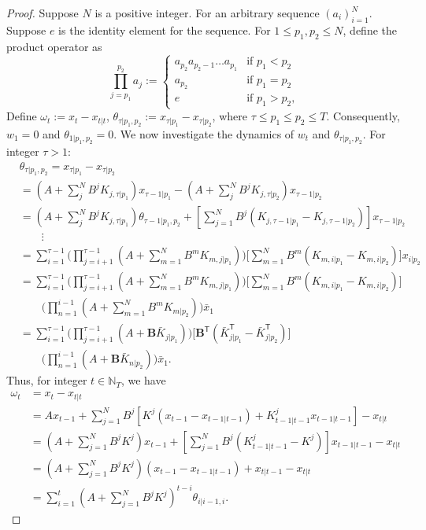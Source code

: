 \documentclass[letterpaper, 10 pt, conference]{ieeeconf}  %
\begin{document}
\begin{proof}
    Suppose $N$ is a positive integer. For an arbitrary sequence $(a_{i})_{i=1}^{N}$. Suppose $e$ is the identity element for the sequence. For $1\leq p_{1},p_{2}\leq N$, define the product operator as
\begin{equation*}
    \prod_{j=p_{1}}^{p_{2}} a_{j} := 
    \begin{cases}
        a_{p_{2}}a_{p_{2}-1}\dots a_{p_{1}} & \text{if $p_{1} < p_{2}$}\\
        a_{p_{2}} & \text{if $p_{1} = p_{2}$}\\
        e & \text{if $p_{1} > p_{2}$},
    \end{cases}
\end{equation*}
Define $\omega_{t} := x_{t}-x_{t|t}$, $\theta_{\tau| p_{1},p_{2}} := x_{\tau|p_{1}}-x_{\tau|p_{2}}$, where $\tau \leq p_{1}\leq p_{2}\leq T$. Consequently, $w_{1} = 0$ and $\theta_{1|p_{1},p_{2}}=0$. We now investigate the dynamics of $w_{t}$ and $\theta_{\tau|p_{1},p_{2}}$. For integer $\tau > 1$:
\begin{align*}
    &\theta_{\tau|p_{1},p_{2}}= x_{\tau|p_{1}}-x_{\tau|p_{2}}\\
    &= (A+\sum_{j}^{N}B^{j}K_{j,\tau|p_{1}})x_{\tau-1|p_{1}} - (A+\sum_{j}^{N}B^{j}K_{j,\tau|p_{2}})x_{\tau-1|p_{2}}\\
    &= (A+\sum_{j}^{N}B^{j}K_{j,\tau|p_{1}})\theta_{\tau-1|p_{1},p_{2}} + [\sum_{j=1}^{N} B^{j}(K_{j,\tau-1|p_{1}}-K_{j,\tau-1|p_{2}})]x_{\tau-1|p_{2}}\\
    &\qquad \vdots\\
    &= \sum_{i=1}^{\tau-1}\bigg(\prod_{j=i+1}^{\tau-1}(A+\sum_{m=1}^{N}B^{m}K_{m,j|p_{1}})\bigg)\bigg[\sum_{m=1}^{N}B^{m}(K_{m,i|p_{1}}-K_{m,i|p_{2}})\bigg]x_{i|p_{2}}  \\
    &= \sum_{i=1}^{\tau-1}\bigg(\prod_{j=i+1}^{\tau-1}(A+\sum_{m=1}^{N}B^{m}K_{m,j|p_{1}})\bigg)\bigg[\sum_{m=1}^{N}B^{m}(K_{m,i|p_{1}}-K_{m,i|p_{2}})\bigg]\\
    &\qquad\bigg(\prod_{n=1}^{i-1} (A+\sum_{m=1}^{N}B^{m}K_{m|p_{2}})\bigg)\bar{x}_{1}\\
    &= \sum_{i=1}^{\tau-1}\bigg(\prod_{j=i+1}^{\tau-1}(A+\mathbf{B}\bar{K}_{j|p_{1}})\bigg)\bigg[\mathbf{B}^{\mathsf{T}}(\bar{K}_{j|p_{1}}^{\mathsf{T}}-\bar{K}_{j|p_{2}}^{\mathsf{T}})\bigg]\\
    &\qquad\bigg(\prod_{n=1}^{i-1}(A+\mathbf{B}\bar{K}_{n|p_{2}})\bigg)\bar{x}_{1}.
\end{align*}
Thus, for integer $t\in\mathbb{N}_T$, we have
\begin{align*}
    \omega_{t} &= x_{t} - x_{t|t}\\
    &= Ax_{t-1} + \sum_{j=1}^{N}B^{j}[K^{j}(x_{t-1}-x_{t-1|t-1})+K_{t-1|t-1}^{j}x_{t-1|t-1}] - x_{t|t}\\
    &= (A+\sum_{j=1}^{N}B^{j}K^{j})x_{t-1} + [\sum_{j=1}^{N}B^{j}(K_{t-1|t-1}^{j}-K^{j})]x_{t-1|t-1} - x_{t|t}\\
    &= (A+\sum_{j=1}^{N}B^{j}K^{j})(x_{t-1}-x_{t-1|t-1}) + x_{t|t-1}-x_{t|t}\\
    &= \sum_{i=1}^{t} (A+\sum_{j=1}^{N}B^{j}K^{j})^{t-i} \theta_{i|i-1,i}.
\end{align*}


\end{proof}
\end{document}
